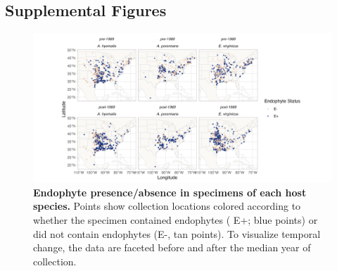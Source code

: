 \documentclass[11pt]{article}
\newcommand{\revise}[1]{{\color{black}{#1}}}
\begin{document}
	\subsection*{Supplemental Figures}
	\begin{figure}[H]
		\centering
		\includegraphics[width =\linewidth]{../Plots/endo_status_map.png}
		\caption[Endophyte presence/absence in specimens of each host species]{\textbf{Endophyte presence/absence in specimens of each host species.} Points show collection locations colored according to whether the specimen contained endophytes ( E+; blue points) or did not contain endophytes (E-, tan points). To visualize temporal change, the data are faceted before and after the median year of collection. \revise{Map lines delineate study areas and do not necessarily depict accepted national boundaries.}}
		\label{fig:endo_status_map}
	\end{figure}
	
\end{document}
